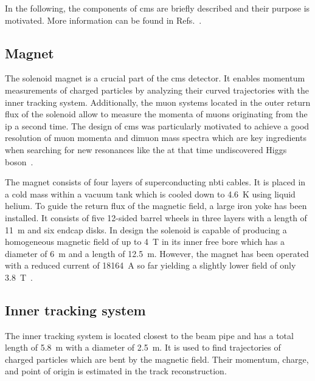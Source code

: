 In the following, the components of \gls{cms} are briefly described and their purpose is motivated. More information can be found in Refs.~\cite{Chatrchyan:2008aa,Bayatian:922757}.


\subsection{Magnet}

The solenoid magnet is a crucial part of the \gls{cms} detector. It enables momentum measurements of charged particles by analyzing their curved trajectories with the inner tracking system. Additionally, the muon systems located in the outer return flux of the solenoid allow to measure the momenta of muons originating from the \gls{ip} a second time. The design of \gls{cms} was particularly motivated to achieve a good resolution of muon momenta and dimuon mass spectra which are key ingredients when searching for new resonances like the at that time undiscovered Higgs boson~\cite{Acquistapace:1997fm}.

The magnet consists of four layers of superconducting \gls{nbti} cables. It is placed in a cold mass within a vacuum tank which is cooled down to 4.6~K using liquid helium. To guide the return flux of the magnetic field, a large iron yoke has been installed. It consists of five 12-sided barrel wheels in three layers with a length of 11~m and six endcap disks. In design the solenoid is capable of producing a homogeneous magnetic field of up to 4~T in its inner free bore which has a diameter of 6~m and a length of 12.5~m. However, the magnet has been operated with a reduced current of 18164~A so far yielding a slightly lower field of only 3.8~T~\cite{Chatrchyan:2009si}. 



\subsection{Inner tracking system}

The inner tracking system is located closest to the beam pipe and has a total length of 5.8~m with a diameter of 2.5~m. It is used to find trajectories of charged particles which are bent by the magnetic field. Their momentum, charge, and point of origin is estimated in the track reconstruction.

